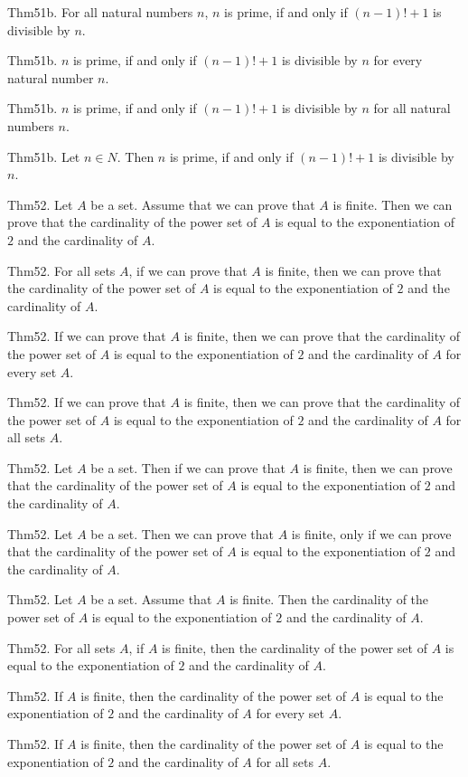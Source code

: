 \documentclass{article}
\begin{document}
Thm51b. For all natural numbers $n$, $n$ is prime, if and only if $(n - 1)! + 1$ is divisible by $n$.

Thm51b. $n$ is prime, if and only if $(n - 1)! + 1$ is divisible by $n$ for every natural number $n$.

Thm51b. $n$ is prime, if and only if $(n - 1)! + 1$ is divisible by $n$ for all natural numbers $n$.

Thm51b. Let $n \in N$. Then $n$ is prime, if and only if $(n - 1)! + 1$ is divisible by $n$.

Thm52. Let $A$ be a set. Assume that we can prove that $A$ is finite. Then we can prove that the cardinality of the power set of $A$ is equal to the exponentiation of $2$ and the cardinality of $A$.

Thm52. For all sets $A$, if we can prove that $A$ is finite, then we can prove that the cardinality of the power set of $A$ is equal to the exponentiation of $2$ and the cardinality of $A$.

Thm52. If we can prove that $A$ is finite, then we can prove that the cardinality of the power set of $A$ is equal to the exponentiation of $2$ and the cardinality of $A$ for every set $A$.

Thm52. If we can prove that $A$ is finite, then we can prove that the cardinality of the power set of $A$ is equal to the exponentiation of $2$ and the cardinality of $A$ for all sets $A$.

Thm52. Let $A$ be a set. Then if we can prove that $A$ is finite, then we can prove that the cardinality of the power set of $A$ is equal to the exponentiation of $2$ and the cardinality of $A$.

Thm52. Let $A$ be a set. Then we can prove that $A$ is finite, only if we can prove that the cardinality of the power set of $A$ is equal to the exponentiation of $2$ and the cardinality of $A$.

Thm52. Let $A$ be a set. Assume that $A$ is finite. Then the cardinality of the power set of $A$ is equal to the exponentiation of $2$ and the cardinality of $A$.

Thm52. For all sets $A$, if $A$ is finite, then the cardinality of the power set of $A$ is equal to the exponentiation of $2$ and the cardinality of $A$.

Thm52. If $A$ is finite, then the cardinality of the power set of $A$ is equal to the exponentiation of $2$ and the cardinality of $A$ for every set $A$.

Thm52. If $A$ is finite, then the cardinality of the power set of $A$ is equal to the exponentiation of $2$ and the cardinality of $A$ for all sets $A$.
\end{document}
